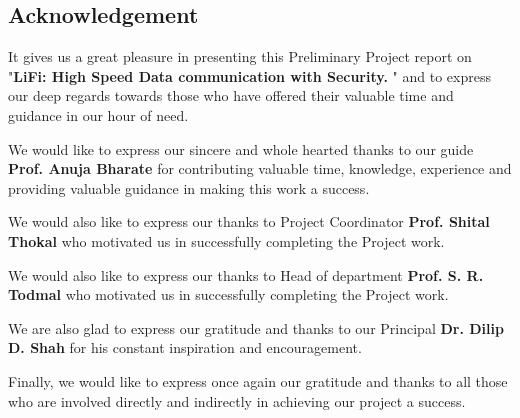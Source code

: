 \documentclass[12pt,a4paper]
{article}
\numberwithin{table}{section}
\begin{document}
		\newpage					%
\pagestyle{plain}
		\begin{center}				%
			
				\section*{Acknowledgement}
				\vspace{.15 in}       %
			
		\end{center}

		\begin{normalsize}
{

				{\setlength{\baselineskip}{1.5\baselineskip}
				It gives us a great pleasure in presenting this Preliminary Project report on "\textbf{LiFi: High Speed Data communication with Security. }" and to express our deep regards towards those who have offered their valuable time and guidance in our hour of need.
				
	\vspace*{.15in}	
	
We would like to express our sincere and whole hearted thanks to our  guide \textbf{Prof. Anuja Bharate} for contributing valuable time, knowledge, experience and providing valuable guidance in making this work a success.


\vspace*{.15in}	

	

We would also like to express our thanks to Project Coordinator \textbf{Prof. Shital Thokal} who
motivated us in successfully completing the Project work.


\vspace*{.15in}	

We would also like to express our thanks to Head of department \textbf{Prof. S. R. Todmal} who
motivated us in successfully completing the Project work.

\vspace*{.15in}	

We are also glad to express our gratitude and thanks to our Principal \textbf{Dr. Dilip D. Shah} for his constant inspiration and encouragement.

\vspace*{.15in}	

Finally, we would like to express once again our gratitude and thanks to all those who are involved directly and indirectly in achieving our project a success.


}}
\end{normalsize}
\end{document}
